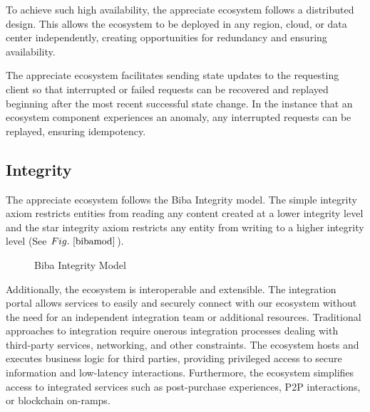\documentclass[a4paper,onecolumn, 10.5pt]{article}
\begin{document}
To achieve such high availability, the appreciate ecosystem follows a distributed design. This allows the ecosystem to be deployed in any region, cloud, or data center independently, creating opportunities for redundancy and ensuring availability.

The appreciate ecosystem facilitates sending state updates to the requesting client so that interrupted or failed requests can be recovered and replayed beginning after the most recent successful state change. In the instance that an ecosystem component experiences an anomaly, any interrupted requests can be replayed, ensuring idempotency.

\subsection{Integrity}

The appreciate ecosystem follows the Biba Integrity\cite{biba} model. The simple integrity axiom restricts entities from reading any content created at a lower integrity level and the star integrity axiom restricts any entity from writing to a higher integrity level (See \(Fig.~\ref{bibamod}\)).

\begin{figure}[!htb]
	\centering %
	\caption{Biba Integrity Model}
	\label{bibamod}
\end{figure}


Additionally, the ecosystem is interoperable and extensible. The integration portal allows services to easily and securely connect with our ecosystem without the need for an independent integration team or additional resources. Traditional approaches to integration require onerous integration processes dealing with third-party services, networking, and other constraints. The ecosystem hosts and executes business logic for third parties, providing privileged access to secure information and low-latency interactions. Furthermore, the ecosystem simplifies access to integrated services such as post-purchase experiences, P2P interactions, or blockchain on-ramps. 
\end{document}
